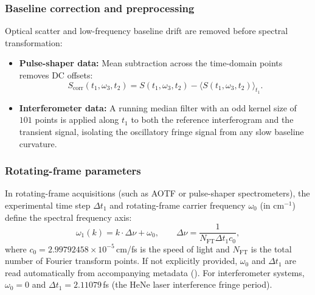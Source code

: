 \subsubsection{Baseline correction and preprocessing}
Optical scatter and low-frequency baseline drift are removed before spectral transformation:
\begin{itemize}
  \item \textbf{Pulse-shaper data:} Mean subtraction across the time-domain points removes DC offsets:
    \begin{equation}
      S_{\text{corr}}(t_1, \omega_3, t_2) = S(t_1, \omega_3, t_2) - \langle S(t_1, \omega_3, t_2) \rangle_{t_1}.
    \end{equation}
  \item \textbf{Interferometer data:} A running median filter with an odd kernel size of $101$ points is applied along $t_1$ to both the reference interferogram and the transient signal, isolating the oscillatory fringe signal from any slow baseline curvature.
\end{itemize}

\subsubsection{Rotating-frame parameters}
In rotating-frame acquisitions (such as AOTF or pulse-shaper spectrometers), the experimental time step $\Delta t_1$ and rotating-frame carrier frequency $\omega_0$ (in cm$^{-1}$) define the spectral frequency axis:
\begin{equation}
  \omega_1(k) = k \cdot \Delta\nu + \omega_0, \qquad \Delta\nu = \frac{1}{N_{\text{FT}} \Delta t_1 c_0},
\end{equation}
where $c_0 = 2.99792458\times 10^{-5}$\,cm/fs is the speed of light and $N_{\text{FT}}$ is the total number of Fourier transform points. If not explicitly provided, $\omega_0$ and $\Delta t_1$ are read automatically from accompanying metadata (). For interferometer systems, $\omega_0 = 0$ and $\Delta t_1 = 2.11079$\,fs (the HeNe laser interference fringe period).

